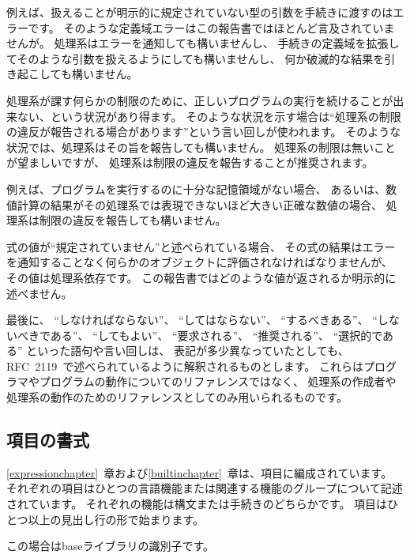 例えば、扱えることが明示的に規定されていない型の引数を手続きに渡すのはエラーです。
そのような定義域エラーはこの報告書ではほとんど言及されていませんが。
処理系はエラーを通知しても構いませんし、
手続きの定義域を拡張してそのような引数を扱えるようにしても構いませんし、
何か破滅的な結果を引き起こしても構いません。

\vest 処理系が課す何らかの制限のために、正しいプログラムの実行を続けることが出来ない、という状況があり得ます。
そのような状況を示す場合は``処理系の制限の違反が報告される場合があります''という言い回しが使われます。
そのような状況では、処理系はその旨を報告しても構いません。
処理系の制限は無いことが望ましいですが、
処理系は制限の違反を報告することが推奨されます。

\vest 例えば、プログラムを実行するのに十分な記憶領域がない場合、
あるいは、数値計算の結果がその処理系では表現できないほど大きい正確な数値の場合、
処理系は制限の違反を報告しても構いません。

\vest 式の値が``規定されていません''と述べられている場合、
その式の結果はエラーを通知することなく何らかのオブジェクトに評価されなければなりませんが、
その値は処理系依存です。
この報告書ではどのような値が返されるか明示的に述べません。

\vest 最後に、
``しなければならない''、
``してはならない''、
``するべきある''、
``しないべきである''、
``してもよい''、
``要求される''、
``推奨される''、
``選択的である''
といった語句や言い回しは、
表記が多少異なっていたとしても、
RFC~2119~\cite{rfc2119}で述べられているように解釈されるものとします。
これらはプログラマやプログラムの動作についてのリファレンスではなく、
処理系の作成者や処理系の動作のためのリファレンスとしてのみ用いられるものです。



\subsection{項目の書式}

\ref{expressionchapter}~章および\ref{builtinchapter}~章は、項目に編成されています。
それぞれの項目はひとつの言語機能または関連する機能のグループについて記述されています。
それぞれの機能は構文または手続きのどちらかです。
項目はひとつ以上の見出し行の形で始まります。

\noindent{}\unpenalty

この場合はbaseライブラリの識別子です。

\noindent{}\unpenalty

